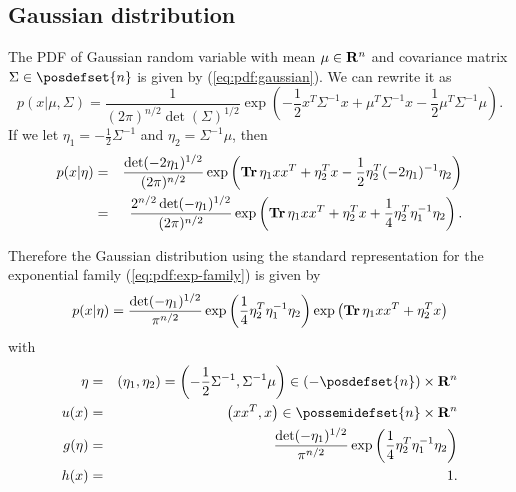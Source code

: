 \subsection{Gaussian distribution}

The PDF of Gaussian random variable with mean $\mu\in\mathbf{R}^n$ and covariance matrix $\Sigma\in\posdefset{n}$ is
given by (\ref{eq:pdf:gaussian}). We can rewrite it as
\begin{equation}
p(x|\mu,\Sigma) = \frac{1}{(2\pi)^{n/2}\det(\Sigma)^{1/2}} \exp\left(
-\frac{1}{2} x^T \Sigma^{-1} x
+ \mu^T \Sigma^{-1} x - \frac{1}{2} \mu^T \Sigma^{-1} \mu
\right).
\end{equation}
If we let $\eta_1 = - \frac{1}{2} \Sigma^{-1}$ and $\eta_2 = \Sigma^{-1} \mu$,
then
\begin{eqnarray*}
p(x|\eta)
&=&
\frac{\det(-2\eta_1)^{1/2}}{(2\pi)^{n/2}} \exp\left(
\mathop{\bf Tr} \eta_1 xx^T + \eta_2^T x
- \frac{1}{2} \eta_2^T  (-2\eta_1)^{-1} \eta_2
\right)
\\
&=&
\frac{2^{n/2}\det(-\eta_1)^{1/2}}{(2\pi)^{n/2}} \exp\left(
\mathop{\bf Tr} \eta_1 xx^T + \eta_2^T x
+ \frac{1}{4} \eta_2^T  \eta_1^{-1} \eta_2
\right).
\end{eqnarray*}

Therefore
the Gaussian distribution using the standard representation for the exponential family (\ref{eq:pdf:exp-family})
is given by
\begin{equation}
\label{eq:pdf:gaussian:exp}
p(x|\eta) = \frac{\det(-\eta_1)^{1/2}}{\pi^{n/2}} \exp\left(\frac{1}{4} \eta_2^T  \eta_1^{-1} \eta_2 \right)
\exp\left( \mathop{\bf Tr} \eta_1 xx^T + \eta_2^T x \right)
\end{equation}
with
\begin{eqnarray}
\eta &=& (\eta_1, \eta_2) = \left(-\frac{1}{2} \Sigma^{-1}, \Sigma^{-1}\mu \right) \in (-\posdefset{n}) \times \reals^n
\\
u(x) &=& \left(xx^T, x\right) \in \possemidefset{n} \times \reals^n
\\
g(\eta) &=& \frac{\det(-\eta_1)^{1/2}}{\pi^{n/2}} \exp\left(\frac{1}{4} \eta_2^T  \eta_1^{-1} \eta_2 \right)
\\
h(x) &=& 1.
\end{eqnarray}



